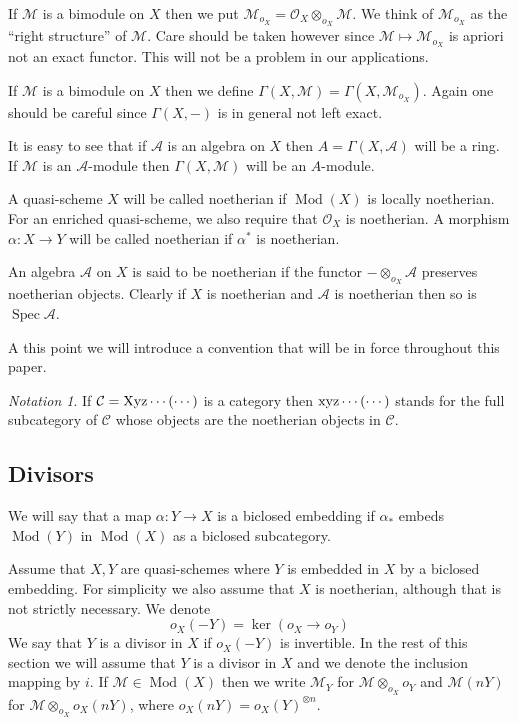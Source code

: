 \documentclass{amsproc}
\def\Ascr{{\mathcal A}}
\def\Cscr{{\mathcal C}}
\def\Mscr{{\mathcal M}}
\def\Oscr{{\mathcal O}}
\def\Spec{\operatorname {Spec}}
\def\ker{\operatorname {ker}}
\def\Qch{\operatorname {Mod}}
\def\r{\rightarrow}
\let\oldtext\text
\def\text#1{\oldtext{\upshape #1}}
\theoremstyle{definition}
\theoremstyle{remark}
\newtheorem{notation}{Notation}\def\thenotation{}
\numberwithin{equation}{section}
\numberwithin{table}{section}
\numberwithin{figure}{section}
\begin{document}
If $\Mscr$ is a bimodule on $X$ then we put
$\Mscr_{o_X}=\Oscr_X\otimes_{o_X} \Mscr$. We think of $\Mscr_{o_X}$ as
the ``right structure'' of $\Mscr$. Care should be taken however
since $\Mscr\mapsto \Mscr_{o_X}$ is apriori not an exact
functor. This will not be a problem in our applications.

If 
 $\Mscr$ is a bimodule on $X$ then we define
$\Gamma(X,\Mscr)=\Gamma(X,\Mscr_{o_X})$. 
Again one should be careful since $\Gamma(X,-)$ is in general not left
exact. 

It is easy to see that if
$\Ascr$ is an algebra on $X$ then $A=\Gamma(X,\Ascr)$ will be a ring.
If $\Mscr$ is an $\Ascr$-module then $\Gamma(X,\Mscr)$ will be an
$A$-module.


A quasi-scheme $X$ will be called  noetherian 
if $\Qch(X)$ is locally noetherian. For an enriched quasi-scheme, we
also require  that $\Oscr_X$ is noetherian. A morphism
$\alpha:X\r Y$ will be called noetherian 
if $\alpha^\ast$ is noetherian.

An algebra $\Ascr$ on $X$ is said to be noetherian if the
functor $-\otimes_{o_X}\Ascr$ preserves noetherian objects. Clearly if
$X$ is noetherian and $\Ascr$ is noetherian then so is $\Spec\Ascr$.

A this point we will introduce a convention that will be in force
throughout this paper. 
\begin{notation} If $\Cscr=\text{Xyz}\cdots(\cdots)$ is a category
  then $\text{xyz}\cdots(\cdots)$ stands for the full subcategory of
  $\Cscr$ whose objects are the noetherian objects in $\Cscr$.
\end{notation}







\subsection{Divisors}
\label{ref:3.7b}

We will say that a  map $\alpha:Y\r X$ is a biclosed embedding if
$\alpha_\ast$ embeds $\Qch(Y)$ in $\Qch(X)$ as a biclosed subcategory.

Assume that $X,Y$ are quasi-schemes where $Y$ is embedded in
$X$ by a biclosed embedding. For simplicity we also assume that $X$ is
noetherian, although that is not strictly necessary. We denote 
\[
o_X(-Y)=\ker(o_X\r o_{Y})
\]
We say that $Y$ is a divisor in $X$ if
$o_X(-Y)$ is invertible. In the rest of this section we will assume
that $Y$ is a divisor in $X$ and we denote the inclusion mapping by
$i$.  If $\Mscr\in\Qch(X)$ then we write $\Mscr_Y$ for
$\Mscr\otimes_{o_X}o_Y$ and $\Mscr(nY)$ for $\Mscr\otimes_{o_X}
o_X(nY)$, where $o_X(nY)=o_X(Y)^{\otimes n}$.
\end{document}
